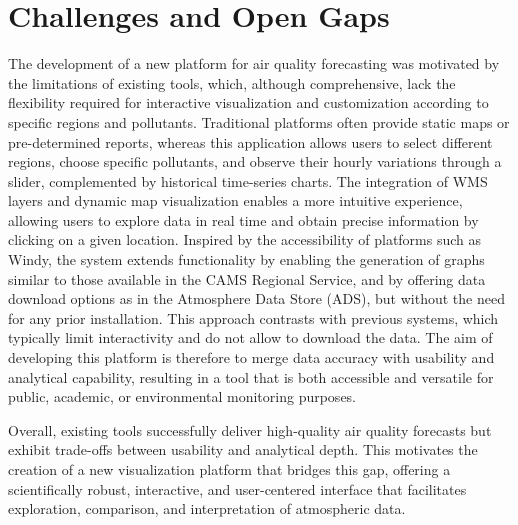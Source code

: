 \section{Challenges and Open Gaps}

The development of a new platform for air quality forecasting was motivated by the limitations of existing tools, which, although comprehensive, lack the flexibility required for interactive visualization and customization according to specific regions and pollutants. Traditional platforms often provide static maps or pre-determined reports, whereas this application allows users to select different regions, choose specific pollutants, and observe their hourly variations through a slider, complemented by historical time-series charts. The integration of WMS layers and dynamic map visualization enables a more intuitive experience, allowing users to explore data in real time and obtain precise information by clicking on a given location. Inspired by the accessibility of platforms such as Windy, the system extends functionality by enabling the generation of graphs similar to those available in the CAMS Regional Service, and by offering data download options as in the Atmosphere Data Store (ADS), but without the need for any prior installation. This approach contrasts with previous systems, which typically limit interactivity and do not allow to download the data. The aim of developing this platform is therefore to merge data accuracy with usability and analytical capability, resulting in a tool that is both accessible and versatile for public, academic, or environmental monitoring purposes.

Overall, existing tools successfully deliver high-quality air quality forecasts but exhibit trade-offs between usability and analytical depth. This motivates the creation of a new visualization platform that bridges this gap, offering a scientifically robust, interactive, and user-centered interface that facilitates exploration, comparison, and interpretation of atmospheric data.